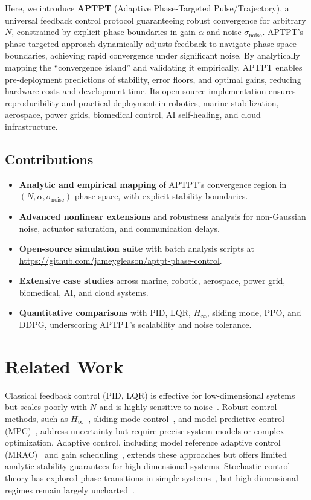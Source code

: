 \documentclass[12pt]{article}
\begin{document}
Here, we introduce \textbf{APTPT} (Adaptive Phase-Targeted Pulse/Trajectory), a universal feedback control protocol guaranteeing robust convergence for arbitrary $N$, constrained by explicit phase boundaries in gain $\alpha$ and noise $\sigma_{\text{noise}}$. APTPT’s phase-targeted approach dynamically adjusts feedback to navigate phase-space boundaries, achieving rapid convergence under significant noise. By analytically mapping the ``convergence island'' and validating it empirically, APTPT enables pre-deployment predictions of stability, error floors, and optimal gains, reducing hardware costs and development time. Its open-source implementation ensures reproducibility and practical deployment in robotics, marine stabilization, aerospace, power grids, biomedical control, AI self-healing, and cloud infrastructure.

\subsection{Contributions}
\begin{itemize}
    \item \textbf{Analytic and empirical mapping} of APTPT’s convergence region in $(N, \alpha, \sigma_{\text{noise}})$ phase space, with explicit stability boundaries.
    \item \textbf{Advanced nonlinear extensions} and robustness analysis for non-Gaussian noise, actuator saturation, and communication delays.
    \item \textbf{Open-source simulation suite} with batch analysis scripts at \url{https://github.com/jameygleason/aptpt-phase-control}.
    \item \textbf{Extensive case studies} across marine, robotic, aerospace, power grid, biomedical, AI, and cloud systems.
    \item \textbf{Quantitative comparisons} with PID, LQR, $H_\infty$, sliding mode, PPO, and DDPG, underscoring APTPT’s scalability and noise tolerance.
\end{itemize}

\section{Related Work}
Classical feedback control (PID, LQR) is effective for low-dimensional systems but scales poorly with $N$ and is highly sensitive to noise~\citep{AstromMurray2008}. Robust control methods, such as $H_\infty$~\citep{ZhouDoyle1998}, sliding mode control~\citep{EdwardsSpurgeon1998}, and model predictive control (MPC)~\citep{Mayne2014}, address uncertainty but require precise system models or complex optimization. Adaptive control, including model reference adaptive control (MRAC)~\citep{SlotineLi1991} and gain scheduling~\citep{RughWilson2000}, extends these approaches but offers limited analytic stability guarantees for high-dimensional systems. Stochastic control theory has explored phase transitions in simple systems~\citep{Arnold2003}, but high-dimensional regimes remain largely uncharted~\citep{Kabashima2009}.
\end{document}
